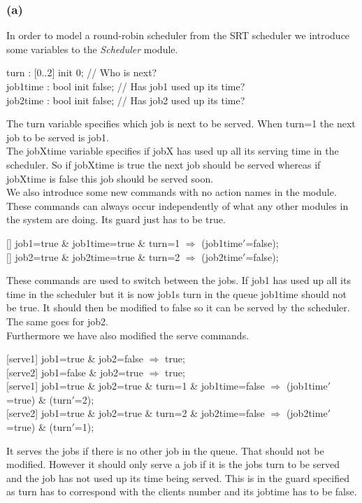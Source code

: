 \documentclass[12pt]{report}
\begin{document}
\subsubsection*{(a)}
In order to model a round-robin scheduler from the SRT scheduler we introduce some variables to the \emph{Scheduler} module.
\begin{center}
turn : {[0..2]} init 0; // Who is next?\\
job1time : bool init false; // Has job1 used up its time?\\
job2time : bool init false; // Has job2 used up its time?\\
\end{center}
The turn variable specifies which job is next to be served. When turn=1 the next job to be served is job1.\\
The jobXtime variable specifies if jobX has used up all its serving time in the scheduler. So if jobXtime is true the next job should be served whereas if jobXtime is false this job should be served soon.\\
We also introduce some new commands with no action names in the module. These commands can always occur independently of what any other modules in the system are doing. Its guard just has to be true.
\begin{center}
{[]} job1=true \& job1time=true \& turn=1 $\Rightarrow$ (job1time$'$=false);\\
{[]} job2=true \& job2time=true \& turn=2 $\Rightarrow$ (job2time$'$=false);
\end{center}
These commands are used to switch between the jobs. If job1 has used up all its time in the scheduler but it is now job1s turn in the queue job1time should not be true. It should then be modified to false so it can be served by the scheduler. The same goes for job2.\\
Furthermore we have also modified the serve commands.
\begin{center}
{[serve1]} job1=true \& job2=false $\Rightarrow$ true;\\
{[serve2]} job1=false \& job2=true $\Rightarrow$ true;\\
{[serve1]} job1=true \& job2=true \& turn=1 \& job1time=false $\Rightarrow$ (job1time$'$=true) \& (turn$'$=2);\\
{[serve2]} job1=true \& job2=true \& turn=2 \& job2time=false $\Rightarrow$ (job2time$'$=true) \& (turn$'$=1);
\end{center}
It serves the jobs if there is no other job in the queue. That should not be modified. However it should only serve a job if it is the jobs turn to be served and the job has not used up its time being served. This is in the guard specified as turn has to correspond with the clients number and its jobtime has to be false.
\end{document}
